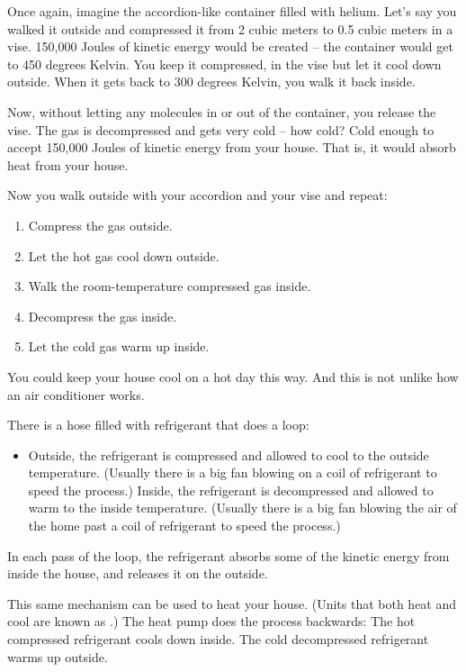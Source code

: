 Once again, imagine the accordion-like container filled with helium.  Let's say you walked it outside and compressed it from 2 cubic meters to 0.5 cubic meters in a vise.  150,000 Joules of kinetic energy would be created -- the container would get to 450 degrees Kelvin.  You keep it compressed, in the vise  but let it cool down outside.  When it gets back to 300 degrees Kelvin,  you walk it back inside.

Now,  without letting any molecules in or out of the container,  you release the vise.  The gas is decompressed and gets very cold -- how cold?  Cold enough to accept 150,000 Joules of kinetic energy from your house.  That is,  it would absorb heat from your house.

Now you walk outside with your accordion and your vise and repeat:
\begin{enumerate}
\item Compress the gas outside.
\item Let the hot gas cool down outside.
\item Walk the room-temperature compressed gas inside.
\item Decompress the gas inside.
\item Let the cold gas warm up inside.
\end{enumerate}

You could keep your house cool on a hot day this way.  And this is not unlike how an air conditioner works.

There is a hose filled with refrigerant that does a loop:  
\begin{itemize}
\item Outside,  the refrigerant is compressed and allowed to cool to the outside temperature.  (Usually there is a big fan blowing on a coil of refrigerant to speed the process.)
Inside,  the refrigerant is decompressed and allowed to warm to the inside temperature.  (Usually there is a big fan blowing the air of the home past a coil of refrigerant to speed the process.)
\end{itemize}

In each pass of the loop,  the refrigerant absorbs some of the kinetic energy from inside the house, and releases it on the outside.

This same mechanism can be used to heat your house.  (Units that both heat and cool are known as .)  
The heat pump does the process backwards:  The hot compressed refrigerant cools down inside.  The cold decompressed refrigerant warms up outside.

